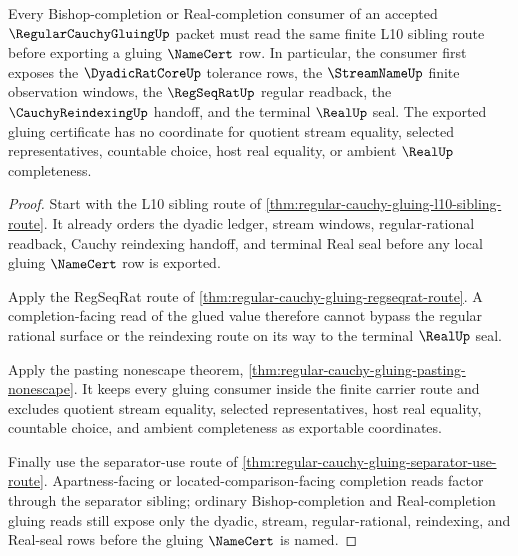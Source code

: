 \begin{theorem}
\label{thm:regular-cauchy-gluing-completion-gluing-consumer}
Every Bishop-completion or Real-completion consumer of an accepted $\RegularCauchyGluingUp$ packet must read the same finite L10 sibling route before exporting a gluing $\NameCert$ row. In particular, the consumer first exposes the $\DyadicRatCoreUp$ tolerance rows, the $\StreamNameUp$ finite observation windows, the $\RegSeqRatUp$ regular readback, the $\CauchyReindexingUp$ handoff, and the terminal $\RealUp$ seal. The exported gluing certificate has no coordinate for quotient stream equality, selected representatives, countable choice, host real equality, or ambient $\RealUp$ completeness.
\end{theorem}
\begin{proof}
Start with the L10 sibling route of \autoref{thm:regular-cauchy-gluing-l10-sibling-route}. It already orders the dyadic ledger, stream windows, regular-rational readback, Cauchy reindexing handoff, and terminal Real seal before any local gluing $\NameCert$ row is exported.

Apply the RegSeqRat route of \autoref{thm:regular-cauchy-gluing-regseqrat-route}. A completion-facing read of the glued value therefore cannot bypass the regular rational surface or the reindexing route on its way to the terminal $\RealUp$ seal.

Apply the pasting nonescape theorem, \autoref{thm:regular-cauchy-gluing-pasting-nonescape}. It keeps every gluing consumer inside the finite carrier route and excludes quotient stream equality, selected representatives, host real equality, countable choice, and ambient completeness as exportable coordinates.

Finally use the separator-use route of \autoref{thm:regular-cauchy-gluing-separator-use-route}. Apartness-facing or located-comparison-facing completion reads factor through the separator sibling; ordinary Bishop-completion and Real-completion gluing reads still expose only the dyadic, stream, regular-rational, reindexing, and Real-seal rows before the gluing $\NameCert$ is named.
\end{proof}


